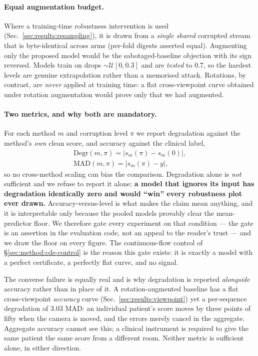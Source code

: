 \paragraph{Equal augmentation budget.}
Where a training-time robustness intervention is used (Sec.~\ref{sec:results:resampling}), it is drawn
from a \emph{single shared} corrupted stream that is byte-identical across arms (per-fold digests
asserted equal). Augmenting only the proposed model would be the sabotaged-baseline objection with
its sign reversed. Models train on drops $\sim\mathcal{U}[0,0.3]$ and are \emph{tested} to $0.7$, so
the hardest levels are genuine extrapolation rather than a memorised attack. Rotations, by contrast,
are \emph{never} applied at training time: a flat cross-viewpoint curve obtained under rotation
augmentation would prove only that we had augmented.

\paragraph{Two metrics, and why both are mandatory.}
For each method $m$ and corruption level $\pi$ we report degradation against the method's \emph{own}
clean score, and accuracy against the clinical label,
%
\begin{equation}
\label{eq:metrics}
\begin{gathered}
\mathrm{Degr}(m,\pi)=\big|s_m(\pi)-s_m(0)\big|,\\[2pt]
\mathrm{MAD}(m,\pi)=\big|s_m(\pi)-y\big| ,
\end{gathered}
\end{equation}
%
so no cross-method scaling can bias the comparison. Degradation alone is \emph{not} sufficient and we
refuse to report it alone: \textbf{a model that ignores its input has degradation identically zero and
would ``win'' every robustness plot ever drawn.} Accuracy-versus-level is what makes the claim mean
anything, and it is interpretable only because the pooled models provably clear the mean-predictor
floor. We therefore gate every experiment on that condition --- the gate is an assertion in the
evaluation code, not an appeal to the reader's trust --- and we draw the floor on every figure. The
continuous-flow control of \S\ref{sec:method:cde-control} is the reason this gate exists: it is exactly
a model with a perfect certificate, a perfectly flat curve, and no signal.

The converse failure is equally real and is why degradation is reported \emph{alongside} accuracy
rather than in place of it. A rotation-augmented baseline has a flat cross-viewpoint \emph{accuracy}
curve (Sec.~\ref{sec:results:viewpoint}) yet a per-sequence degradation of $3.03$ MAD: an individual
patient's score moves by three points of fifty when the camera is moved, and the errors merely cancel
in the aggregate. Aggregate accuracy cannot see this; a clinical instrument is required to give the
same patient the same score from a different room. Neither metric is sufficient alone, in either
direction.

